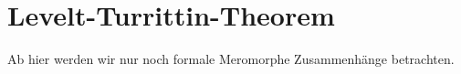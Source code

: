\chapter{Levelt-\!Turrittin-\!Theorem}
\begin{comment}
Quellen:\\
sabbah\_cimpa90 seite 28 / 30

\begin{thm}[Levelt-Turittin]
Es ex. endliche Körper $\hat{L}|\hat{K}$ mit $\hat{L}=\C((u))$ mit
$\hat{K}\hookrightarrow\hat{L},x\mapsto u^p$ so dass:
\[
\hat{M}\otimes_{\hat{K}}\hat{L}=\bigoplus_{i=1}^r\hat{M}_i
\]
mit $#\slopes(\hat{M}_i)=1 \forall i$ bzw. genauer
$\hat{M}_i=\xi^{\phi_i}\otimes R$
\end{thm}

\begin{thm}[Levelt-Turrittin-Malgrange]
$\exist \hat L|\hat K$ mit $\hat M_i\otimes _{\hat K}\hat L =
\bigoplus_{j=1}^s \hat N_j$
mit 
\[
\hat N_i=\xi^{\phi_j}\otimes R
\]
und 
\begin{itemize}
\item $\dim_L\xi^{\phi_j}=1$, $\phi_j\in \C[u^{-1}]\cdot u^{-1}$
\item R regulär singulär, also mit $\slopes=\{0\}$ %
\end{itemize}
\end{thm}
\end{comment}

Ab hier werden wir nur noch formale Meromorphe Zusammenhänge betrachten. 

\begin{comment}
Sei $M_{\hat{K}}=\cD_{\hat{K}}/\cD_{\hat{K}}\cdot P$ und nehme an, dass $N(P)$
zumindes 2 nichttriviale Steigungen hat. Spalte $N(P)=N_1\dot\cup N_2$ in 2
Teile. Dann gilt:

\begin{lem}
Es existiert eine Aufteilung $P=P_1P_2$ mit:
\begin{itemize}
\item $N(P_1)\subset N_1$ und $N(P_2)\subset N_2$
\item A ist eine kante von ...
\end{itemize}
\end{lem}
\end{comment}

